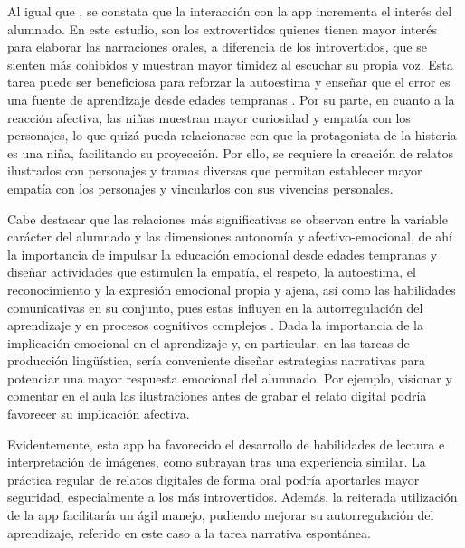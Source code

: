\documentclass[spanish]{textolivre}
\begin{document}
Al igual que \textcite{bertolini_theory_2017}, se constata que la interacción con la app incrementa el interés del alumnado. En este estudio, son los extrovertidos quienes tienen mayor interés para elaborar las narraciones orales, a diferencia de los introvertidos, que se sienten más cohibidos y muestran mayor timidez al escuchar su propia voz. Esta tarea puede ser beneficiosa para reforzar la autoestima y enseñar que el error es una fuente de aprendizaje desde edades tempranas \cite{cepa_serrano_educacion_2017}. Por su parte, en cuanto a la reacción afectiva, las niñas muestran mayor curiosidad y empatía con los personajes, lo que quizá pueda relacionarse con que la protagonista de la historia es una niña, facilitando su proyección. Por ello, se requiere la creación de relatos ilustrados con personajes y tramas diversas que permitan establecer mayor empatía con los personajes y vincularlos con sus vivencias personales.

Cabe destacar que las relaciones más significativas se observan entre la variable carácter del alumnado y las dimensiones autonomía y afectivo-emocional, de ahí la importancia de impulsar la educación emocional desde edades tempranas y diseñar actividades que estimulen la empatía, el respeto, la autoestima, el reconocimiento y la expresión emocional propia y ajena, así como las habilidades comunicativas en su conjunto, pues estas influyen en la autorregulación del aprendizaje y en procesos cognitivos complejos \cite{bocci_apps_2017,ramya_gangaiamaran_review_2017}. Dada la importancia de la implicación emocional en el aprendizaje y, en particular, en las tareas de producción lingüística, sería conveniente diseñar estrategias narrativas para potenciar una mayor respuesta emocional del alumnado. Por ejemplo, visionar y comentar en el aula las ilustraciones antes de grabar el relato digital podría favorecer su implicación afectiva.

Evidentemente, esta app ha favorecido el desarrollo de habilidades de lectura e interpretación de imágenes, como subrayan \textcite{leon_review_2017} tras una experiencia similar. La práctica regular de relatos digitales de forma oral podría aportarles mayor seguridad, especialmente a los más introvertidos. Además, la reiterada utilización de la app facilitaría un ágil manejo, pudiendo mejorar su autorregulación del aprendizaje, referido en este caso a la tarea narrativa espontánea.
\end{document}
